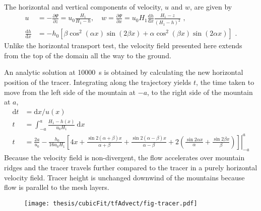 The horizontal and vertical components of velocity, $u$ and $w$, are given by
\begin{align}
	u &= -\frac{\partial \Psi}{\partial z} = u_0 \frac{H_1}{H_1 - h}, \quad w = \frac{\partial \Psi}{\partial x} = u_0 H_1 \frac{\mathrm{d} h}{\mathrm{d} x} \frac{H_1 - z}{\left( H_1 - h \right)^2} \label{eqn:slanted:uw-btf} \text{ ,}\\
	\frac{\mathrm{d} h}{\mathrm{d} x} &= - h_0 \left[ 
		\beta \cos^2 \left( \alpha x \right) \sin \left( 2 \beta x \right) +
		\alpha \cos^2 \left( \beta x \right) \sin \left( 2 \alpha x \right)
	\right] \text{ .}
\end{align}
Unlike the horizontal transport test, the velocity field presented here extends from the top of the domain all the way to the ground.

An analytic solution at \SI{10000}{\second} is obtained by calculating the new horizontal position of the tracer.  Integrating along the trajectory yields $t$, the time taken to move from the left side of the mountain at $-a$, to the right side of the mountain at $a$,
\begin{align}
	\mathrm{d}t &= \mathrm{d}x / u(x) \\
	t &= \int_{-a}^a \frac{H_1 - h(x)}{u_0 H_1}\:\mathrm{d}x \\
	t &= \left. \frac{2a}{u_0} - \frac{h_0}{16 u_0 H_1} \left[ 4x + \frac{\sin 2 (\alpha + \beta) x}{\alpha + \beta} +
\frac{\sin 2(\alpha - \beta) x}{\alpha - \beta} + 2 \left( \frac{\sin 2\alpha x}{\alpha} + \frac{\sin 2\beta x}{\beta} \right) \right] \right\rvert_{-a}^a
\end{align}
Because the velocity field is non-divergent, the flow accelerates over mountain ridges and the tracer travels  further compared to the tracer in a purely horizontal velocity field.  Tracer height is unchanged downwind of the mountains because flow is parallel to the mesh layers.

\begin{figure}
	\centering
	\texttt{[image: thesis/cubicFit/tfAdvect/fig-tracer.pdf]}
	\caption{}
	\label{fig:cubicFit:tfAdvect:tracer}
\end{figure}
